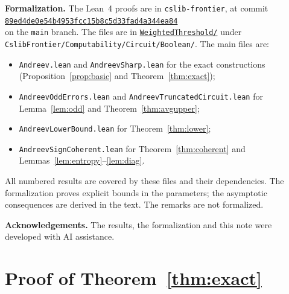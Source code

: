 \documentclass[11pt,letterpaper]{article}
\theoremstyle{remark}
\newcommand{\sect}[1]{\section{\texorpdfstring{\color{ink}#1}{#1}}}
\newcommand{\smalltitle}[1]{\textbf{\color{ink}#1}\quad}
\begin{document}
\smalltitle{Formalization.}
The Lean~4 proofs are in \texttt{cslib-frontier}, at commit\\
\href{https://github.com/cslib-community/cslib-frontier/commit/89ed4de0e54b4953fcc15b8c5d33fad4a344ea84}{\texttt{89ed4de0e54b4953fcc15b8c5d33fad4a344ea84}}\\
on the \texttt{main} branch. The files are in
\href{https://github.com/cslib-community/cslib-frontier/tree/89ed4de0e54b4953fcc15b8c5d33fad4a344ea84/CslibFrontier/Computability/Circuit/Boolean/WeightedThreshold}{\texttt{WeightedThreshold/}}
under \nolinkurl{CslibFrontier/Computability/Circuit/Boolean/}.
The main files are:
\begin{itemize}
\item \texttt{Andreev.lean} and \texttt{AndreevSharp.lean} for the exact
      constructions (Proposition~\ref{prop:basic} and Theorem~\ref{thm:exact});
\item \texttt{AndreevOddErrors.lean} and \texttt{AndreevTruncatedCircuit.lean}
      for Lemma~\ref{lem:odd} and Theorem~\ref{thm:avgupper};
\item \texttt{AndreevLowerBound.lean} for Theorem~\ref{thm:lower};
\item \texttt{AndreevSignCoherent.lean} for Theorem~\ref{thm:coherent} and
      Lemmas~\ref{lem:entropy}--\ref{lem:diag}.
\end{itemize}
All numbered results are covered by these files and their dependencies.
The formalization proves explicit bounds in the parameters; the asymptotic
consequences are derived in the text. The remarks are not formalized.

\smalltitle{Acknowledgements.}
The results, the formalization and this note were developed with AI
assistance.

\appendix
\renewcommand{\thesection}{\Alph{section}}
\sect{Proof of Theorem~\ref{thm:exact}}\label{app:exact}
\end{document}
